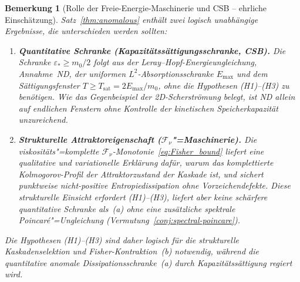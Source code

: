 \documentclass[12pt,a4paper]{article}
\theoremstyle{breakdef}
\theoremstyle{breakplain}
\theoremstyle{breakdef}
\newtheorem{remark}[definition]{Bemerkung}
\begin{document}
\begin{remark}[Rolle der Freie-Energie-Maschinerie und CSB -- ehrliche Einschätzung]
\label{rem:F-role}
Satz~\ref{thm:anomalous} enthält zwei logisch unabhängige Ergebnisse, die unterschieden werden sollten:
\begin{enumerate}
\item[(a)] \textbf{Quantitative Schranke (Kapazitätssättigungsschranke, CSB).}\quad
  Die Schranke $\varepsilon_* \ge m_0/2$ folgt aus der Leray--Hopf-Energieungleichung, Annahme~ND, der uniformen $L^2$-Absorptionsschranke $E_{\max}$ und dem Sättigungsfenster $T \ge T_{\mathrm{sat}} = 2E_{\max}/m_0$, \emph{ohne} die Hypothesen (H1)--(H3) zu benötigen. Wie das Gegenbeispiel der 2D-Scherströmung belegt, ist ND allein auf endlichen Fenstern ohne Kontrolle der kinetischen Speicherkapazität unzureichend.
\item[(b)] \textbf{Strukturelle Attraktoreigenschaft (\mbox{$\mathcal{F}_\nu$}"=Maschinerie).}\quad
  Die viskositäts"=komplette $\mathcal{F}_\nu$-Monotonie~\eqref{eq:Fisher_bound} liefert eine \emph{qualitative und variationelle} Erklärung dafür, warum das komplettierte Kolmogorov-Profil der Attraktorzustand der Kaskade ist, und sichert punktweise nicht-positive Entropiedissipation ohne Vorzeichendefekte. Diese strukturelle Einsicht erfordert (H1)--(H3), liefert aber \emph{keine} schärfere quantitative Schranke als~(a) ohne eine zusätzliche spektrale Poincaré"=Ungleichung (Vermutung~\ref{conj:spectral-poincare}).
\end{enumerate}
Die Hypothesen (H1)--(H3) sind daher logisch für die strukturelle Kaskadenselektion und Fisher-Kontraktion~(b) notwendig, während die quantitative anomale Dissipationsschranke~(a) durch Kapazitätssättigung regiert wird.
\end{remark}
\end{document}
